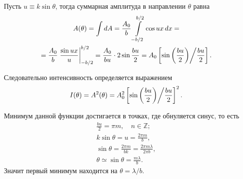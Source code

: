 Пусть $u \equiv k \sin \theta$, тогда суммарная амплитуда в направлении $\theta$ равна
\begin{multline*}
    A(\theta)
    = \int dA
    = \frac{A_0}{b} \int\limits_{-b/2}^{b/2} \cos ux \,d x =\\
    = \frac{A_0}{b} \left. \frac{\sin ux}{u} \right|_{-b/2}^{b/2}
    = \frac{A_0}{bu} \cdot 2 \sin \frac{bu}{2} = A_0 \left[ \sin \left( \frac{bu}{2}\right) \middle/  \frac{bu}{2} \right] .
\end{multline*}

Следовательно интенсивность определяется выражением
\begin{equation}
    I(\theta) = A^2(\theta) = A_0^2 \left[ \sin \left( \frac{bu}{2}\right) \middle/  \frac{bu}{2} \right]^2.
\end{equation}


\begin{wrapfigure}[7]{r}{0.6\tw}
    \centering
    \vspace{-0.8pc}
    \caption{}
    \label{}
\end{wrapfigure}
Минимум данной функции достигается в точках, где обнуляется синус, то есть
\begin{gather*}
    \frac{bu}{2} = \pi m, \quad n \in \mathbb Z;\\
    k \sin \theta = u = \frac{2 \pi m}{b},\\
    \sin \theta = \frac{2 \pi m}{bk} = \frac{2 \pi m \lambda}{2 \pi b},\\
    \theta \simeq \sin \theta = \frac{m \lambda}{b}.
\end{gather*}
Значит первый минимум находится на $\theta = \lambda/b$.

